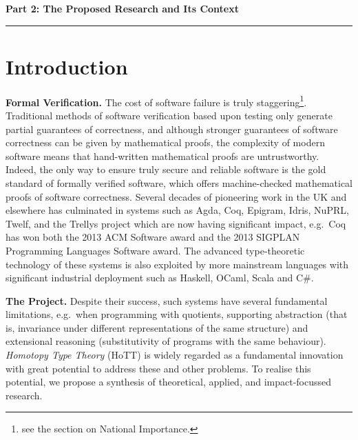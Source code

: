 \documentclass[a4paper,11pt]{article}
\newcommand{\eg}{{e.g.}\ }
\begin{document}
\newpage
\noindent
{\bf \Large Part 2: The Proposed Research and Its Context}

\vspace*{-0.23in}

\begin{center}
\rule{170mm}{.5mm}
\end{center}

\vspace*{-0.4in}

\section{Introduction}\label{sec:intro}

\vspace*{-0.1in}

{\bf Formal Verification.} The cost of software failure is truly
staggering\footnote{see the section on National
  Importance.}. Traditional methods of software verification based
upon testing only generate partial guarantees of correctness, and
although stronger
guarantees of software correctness can be given by mathematical
proofs, the complexity of modern software means that hand-written
mathematical proofs are untrustworthy. Indeed, the only way to
ensure truly secure and reliable software is the gold standard of
formally verified software, which offers machine-checked mathematical
proofs of software correctness. Several decades of pioneering work in
the UK and elsewhere has culminated in systems 
such as Agda, Coq, Epigram, Idris, NuPRL, Twelf, and
the Trellys project which are now having significant impact,
\eg Coq has won both the 2013 ACM Software award and the 2013 SIGPLAN
Programming Languages Software award. The advanced type-theoretic
technology of these systems is also exploited by more mainstream languages
with significant industrial deployment such as Haskell, OCaml, Scala
and C\#.


{\bf The Project.} Despite their success, such systems have several
fundamental limitations, \eg when programming with quotients,
supporting abstraction (that is, invariance under different
representations of the same structure) and extensional reasoning
(substitutivity of programs with the same behaviour).  {\em
  Homotopy Type Theory} (HoTT) is widely regarded as a fundamental
innovation with great potential to address these and other problems.
To realise this potential, we propose a synthesis of
theoretical, applied, and impact-focussed research.
\end{document}
